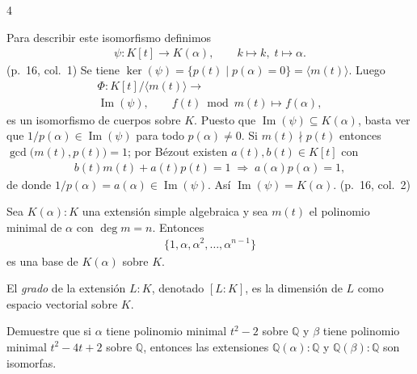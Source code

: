 \documentclass[landscape,a4paper]{article}
\begin{document}
\begin{multicols}{4}
\begin{tcolorbox}[colback=white,colframe=red!80!black,colbacktitle=red!80!black,coltitle=white,title={Teorema: Extensiones simples algebraicas (p.~16, col.~1)}]
\end{tcolorbox}
Para describir este isomorfismo definimos
\begin{align*}
  \psi:K[t]\longrightarrow K(\alpha),\qquad k\mapsto k,\;t\mapsto \alpha.
\end{align*}
(p.~16, col.~1)
Se tiene $\ker(\psi)=\{p(t)\mid p(\alpha)=0\}=\langle m(t)\rangle$.  Luego
\begin{align*}
  \Phi:K[t]/\langle m(t)\rangle\longrightarrow\\ \operatorname{Im}(\psi),\qquad f(t)\bmod m(t)\longmapsto f(\alpha),
\end{align*}
es un isomorfismo de cuerpos sobre $K$.  Puesto que $\operatorname{Im}(\psi)\subseteq K(\alpha)$, basta ver que $1/p(\alpha)\in\operatorname{Im}(\psi)$ para todo $p(\alpha)\neq0$.  Si $m(t)\nmid p(t)$ entonces $\gcd\bigl(m(t),p(t)\bigr)=1$; por Bézout existen $a(t),b(t)\in K[t]$ con
\begin{align*}
  b(t)m(t)+a(t)p(t)=1\;\Longrightarrow\;a(\alpha)p(\alpha)=1,
\end{align*}
de donde $1/p(\alpha)=a(\alpha)\in\operatorname{Im}(\psi)$.  Así $\operatorname{Im}(\psi)=K(\alpha)$. (p.~16, col.~2)
\begin{tcolorbox}[colback=white,colframe=red!80!black,colbacktitle=red!80!black,coltitle=white,title={Lema (p.~16, col.~3)}]
Sea $K(\alpha):K$ una extensión simple algebraica y sea $m(t)$ el polinomio minimal de $\alpha$ con $\deg m=n$. Entonces
\begin{align*}
  \{1,\alpha,\alpha^{2},\dots,\alpha^{n-1}\}
\end{align*}
es una base de $K(\alpha)$ sobre $K$.
\end{tcolorbox}
\begin{tcolorbox}[colback=white,colframe=blue!80!black,colbacktitle=blue!80!black,coltitle=white,title={Definición: Grado de una extensión (p.~16, col.~3)}]
El \emph{grado} de la extensión $L:K$, denotado $[L:K]$, es la dimensión de $L$ como espacio vectorial sobre $K$.
\end{tcolorbox}
\begin{tcolorbox}[colback=white,colframe=green!50!black,colbacktitle=green!50!black,coltitle=white,title={Ejemplo (p.~16, col.~4)}]
Demuestre que si $\alpha$ tiene polinomio minimal $t^{2}-2$ sobre $\mathbb{Q}$ y $\beta$ tiene polinomio minimal $t^{2}-4t+2$ sobre $\mathbb{Q}$, entonces las extensiones $\mathbb{Q}(\alpha):\mathbb{Q}$ y $\mathbb{Q}(\beta):\mathbb{Q}$ son isomorfas.

\end{tcolorbox}
\end{multicols}
\end{document}
